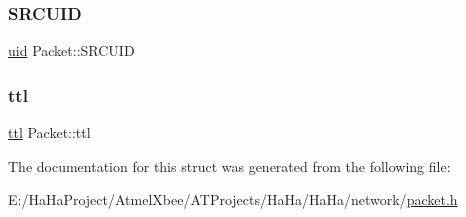 \mbox{\label{struct_packet_a3cef7ca885da48680c0646ae307db4a4}} 
\subsubsection{\texorpdfstring{S\+R\+C\+U\+ID}{SRCUID}}
{\footnotesize\ttfamily \hyperlink{packet_8h_ac065f913fb79988aec421b0f5eebbc77}{uid} Packet\+::\+S\+R\+C\+U\+ID}

\mbox{\label{struct_packet_a63433ac4a59b48ac4c2dee5c330eb99d}} 
\subsubsection{\texorpdfstring{ttl}{ttl}}
{\footnotesize\ttfamily \hyperlink{packet_8h_a22ca626eb8f0deb847d1fae89476e26d}{ttl} Packet\+::ttl}



The documentation for this struct was generated from the following file\+:\begin{DoxyCompactItemize}
\item 
E\+:/\+Ha\+Ha\+Project/\+Atmel\+Xbee/\+A\+T\+Projects/\+Ha\+Ha/\+Ha\+Ha/network/\hyperlink{packet_8h}{packet.\+h}\end{DoxyCompactItemize}
